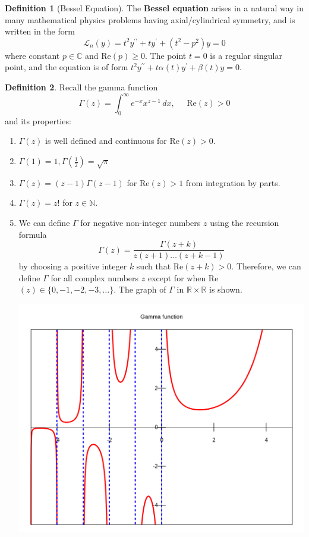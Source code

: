 \documentclass{article}
\theoremstyle{remark}
\theoremstyle{definition}
\newtheorem{definition}{Definition}[section]
\begin{document}
\begin{definition}[Bessel Equation]
The \textbf{Bessel equation} arises in a natural way in many mathematical physics problems having axial/cylindrical symmetry, and is written in the form 
\[\mathcal{L}_n (y) = t^2 y^{\prime\prime} + t y^\prime + (t^2 - p^2) y = 0\]
where constant $p \in \mathbb{C}$ and Re$(p) \geq 0$. The point $t = 0$ is a regular singular point, and the equation is of form $t^2 y^{\prime\prime} + t \alpha(t) y^\prime + \beta(t) y = 0$. 
\end{definition}

\begin{definition}
Recall the gamma function
\[\Gamma (z) = \int_0^\infty e^{-x} x^{z-1} \,dx, \;\;\;\;\; \text{Re}(z) > 0\]
and its properties: 
\begin{enumerate}
    \item $\Gamma(z)$ is well defined and continuous for Re$(z) > 0$. 
    \item $\Gamma(1) = 1, \Gamma(\frac{1}{2}) = \sqrt{\pi}$
    \item $\Gamma(z) = (z-1) \Gamma (z-1)$ for Re$(z) > 1$ from integration by parts. 
    \item $\Gamma(z) = z!$ for $z \in \mathbb{N}$. 
    \item We can define $\Gamma$ for negative non-integer numbers $z$ using the recursion formula 
    \[\Gamma(z) = \frac{\Gamma(z+k)}{z (z+1) \ldots (z+k-1)}\]
    by choosing a positive integer $k$ such that Re$(z+k)>0$. Therefore, we can define $\Gamma$ for all complex numbers $z$ except for when Re$(z) \in \{0, -1, -2, -3, \ldots\}$. The graph of $\Gamma$ in $\mathbb{R} \times \mathbb{R}$ is shown. 
    \begin{center}
        \includegraphics[scale=0.25]{img/Gamma_plot.png}
    \end{center}
\end{enumerate}
\end{definition}
\end{document}
